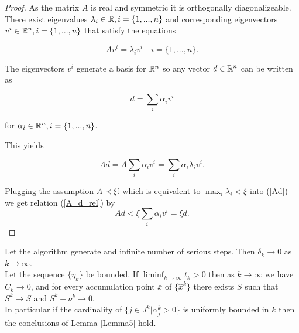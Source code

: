 \begin{proof}
	As the matrix \(A\) is real and symmetric it is orthogonally diagonalizeable.
	There exist eigenvalues \(\lambda_i \in \mathbb{R}, i = \{1,...,n\}\) and corresponding eigenvectors \(v^i \in \mathbb{R}^n, i = \{1,...,n\}\) that satisfy the equations
	
	\begin{equation*}
		Av^i= \lambda_iv^i \quad i = \{1,...,n\}.
		\label{A_d_rel}
	\end{equation*}
	
	The eigenvectors \(v^i\) generate a basis for \(\mathbb{R}^n\) so any vector \(d \in \mathbb{R}^n\) can be written as
	
	\[ d = \sum_{i} {\alpha_i v^i} \]
	
	for \(\alpha_i \in \mathbb{R}^n, i = \{1,...,n\}\).
	
	This yields
	
	\begin{equation}
		Ad = A \sum_i{\alpha_i v^i} = \sum_i \alpha_i \lambda_i v^i.
		\label{Ad}
	\end{equation}
	
	Plugging the assumption \(A \prec \xi \mathbb{I}\) which is equivalent to \(\max_i \lambda_i < \xi\) into (\ref{Ad})
	we get relation (\ref{A_d_rel}) by
		\[Ad < \xi \sum_i \alpha_i v^i = \xi d. \]

\end{proof}

\begin{theorem}
	Let the algorithm generate and infinite number of serious steps. Then \(\delta_k \to 0\) as \(k \to \infty\). \\
	Let the sequence \(\{\eta_k\}\) be bounded. If \(\liminf_{k \to \infty} t_k > 0\) then as \(k \to \infty\) we have \(C_k \to 0\), and for every accumulation point \(\bar{x}\) of \(\{\hat{x}^k\}\) there exists \(\bar{S}\) such that \(S^k \to \bar{S}\) and \(S^k + \nu^k \to 0\). \\
	In particular if the cardinality of \(\{j \in J^k|\alpha_j^k > 0\}\) is uniformly bounded in \(k\) then the conclusions of Lemma \ref{Lemma5} hold.
\end{theorem}

